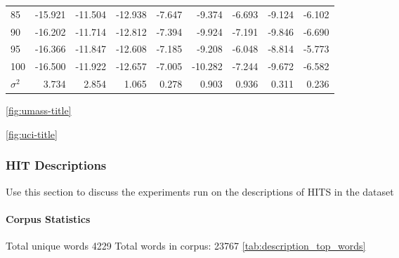 \documentclass[letterpaper,12pt]{article}
\begin{document}
\begin{table}
\begin{center}
\begin{tabular}{|l|rr|rr|rr|rr|}
			85  & -15.921 & -11.504 & -12.938 & -7.647 &  -9.374 & -6.693 & -9.124 & -6.102 \\
			90  & -16.202 & -11.714 & -12.812 & -7.394 &  -9.924 & -7.191 & -9.846 & -6.690 \\
			95  & -16.366 & -11.847 & -12.608 & -7.185 &  -9.208 & -6.048 & -8.814 & -5.773 \\
			100 & -16.500 & -11.922 & -12.657 & -7.005 & -10.282 & -7.244 & -9.672 & -6.582 \\
			\hline
			$\sigma^2$ & 3.734 & 2.854 & 1.065 & 0.278 & 0.903 & 0.936 & 0.311 & 0.236 \\
			\hline
		\end{tabular}
	\end{center}
\end{table}
\ref{fig:umass-title}

\ref{fig:uci-title}

\newpage

\subsubsection{HIT Descriptions}
Use this section to discuss the experiments run on the descriptions of HITS in the dataset

\paragraph{Corpus Statistics}
Total unique words 4229
Total words in corpus: 23767
\ref{tab:description_top_words}
\end{document}
